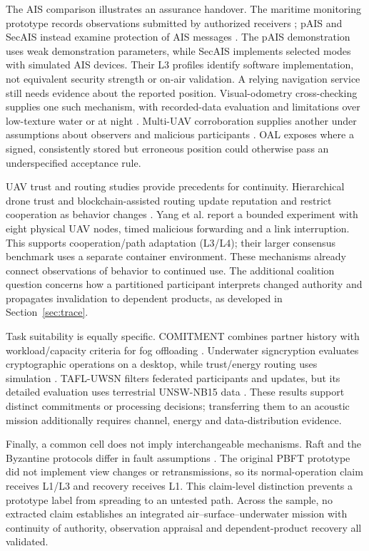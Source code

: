 The AIS comparison illustrates an assurance handover. The maritime monitoring prototype records observations submitted by authorized receivers \citep{maritime2022monitoring}; pAIS and SecAIS instead examine protection of AIS messages \citep{kessler2020protected,goudossis2022secais}. The pAIS demonstration uses weak demonstration parameters, while SecAIS implements selected modes with simulated AIS devices. Their L3 profiles identify software implementation, not equivalent security strength or on-air validation. A relying navigation service still needs evidence about the reported position. Visual-odometry cross-checking supplies one such mechanism, with recorded-data evaluation and limitations over low-texture water or at night \citep{varshosaz2019spoofing}. Multi-UAV corroboration supplies another under assumptions about observers and malicious participants \citep{garcamagario2019security,barka2022towards}. OAL exposes where a signed, consistently stored but erroneous position could otherwise pass an underspecified acceptance rule.

UAV trust and routing studies provide precedents for continuity. Hierarchical drone trust and blockchain-assisted routing update reputation and restrict cooperation as behavior changes \citep{hierarchical2023trust,yang2023trusted}. Yang et al. report a bounded experiment with eight physical UAV nodes, timed malicious forwarding and a link interruption. This supports cooperation/path adaptation (L3/L4); their larger consensus benchmark uses a separate container environment. These mechanisms already connect observations of behavior to continued use. The additional coalition question concerns how a partitioned participant interprets changed authority and propagates invalidation to dependent products, as developed in Section~\ref{sec:trace}.

Task suitability is equally specific. COMITMENT combines partner history with workload/capacity criteria for fog offloading \citep{alkhafajiy2020comitment}. Underwater signcryption evaluates cryptographic operations on a desktop, while trust/energy routing uses simulation \citep{zhang2026underwater,eetauv2025trust}. TAFL-UWSN filters federated participants and updates, but its detailed evaluation uses terrestrial UNSW-NB15 data \citep{tafl2026underwater}. These results support distinct commitments or processing decisions; transferring them to an acoustic mission additionally requires channel, energy and data-distribution evidence.

Finally, a common cell does not imply interchangeable mechanisms. Raft and the Byzantine protocols differ in fault assumptions \citep{raft2014,pbft1999,hotstuff2019,narwhal2022}. The original PBFT prototype did not implement view changes or retransmissions, so its normal-operation claim receives L1/L3 and recovery receives L1. This claim-level distinction prevents a prototype label from spreading to an untested path. Across the sample, no extracted claim establishes an integrated air--surface--underwater mission with continuity of authority, observation appraisal and dependent-product recovery all validated.

